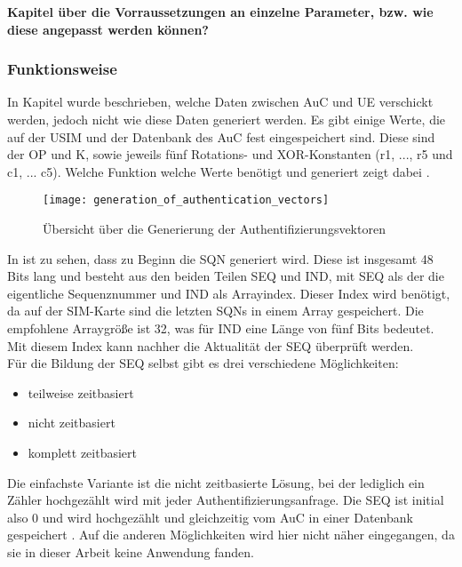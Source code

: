  \textbf{Kapitel über die Vorraussetzungen an einzelne Parameter, bzw. wie diese angepasst werden können?}

 \subsubsection{Funktionsweise}
 In Kapitel  wurde beschrieben, welche Daten zwischen \ac{AuC} und \ac{UE} verschickt werden, jedoch nicht wie diese Daten generiert werden. Es gibt einige Werte, die auf der \ac{USIM} und der Datenbank des \ac{AuC} fest eingespeichert sind. Diese sind der \ac{OP} und \ac{K}, sowie jeweils fünf Rotations- und XOR-Konstanten (r1, ..., r5 und c1, ... c5). Welche Funktion welche Werte benötigt und generiert zeigt dabei .
 
 \begin{figure}[htp]
  \begin{center}
   \texttt{[image: generation\_of\_authentication\_vectors]}
  \end{center}
  \caption{Übersicht über die Generierung der Authentifizierungsvektoren \cite{3gpp.33.102}}
  \label{fig:funktionsubersicht}
 \end{figure}
 
 In  ist zu sehen, dass zu Beginn die \ac{SQN} generiert wird. Diese ist insgesamt 48 Bits lang und besteht aus den beiden Teilen SEQ und IND, mit SEQ als der die eigentliche Sequenznummer und IND als Arrayindex. Dieser Index wird benötigt, da auf der SIM-Karte sind die letzten SQNs in einem Array gespeichert. Die empfohlene Arraygröße ist 32, was für IND eine Länge von fünf Bits bedeutet. Mit diesem Index kann nachher die Aktualität der SEQ überprüft werden.\cite{3gpp.33.102} \\
 Für die Bildung der SEQ selbst gibt es drei verschiedene Möglichkeiten:
 \begin{itemize}
  \item teilweise zeitbasiert
  \item nicht zeitbasiert
  \item komplett zeitbasiert
 \end{itemize}
 
 Die einfachste Variante ist die nicht zeitbasierte Lösung, bei der lediglich ein Zähler hochgezählt wird mit jeder Authentifizierungsanfrage. Die SEQ ist initial also 0 und wird hochgezählt und gleichzeitig vom \ac{AuC} in einer Datenbank gespeichert \cite{3gpp.33.102}. Auf die anderen Möglichkeiten wird hier nicht näher eingegangen, da sie in dieser Arbeit keine Anwendung fanden.
 
